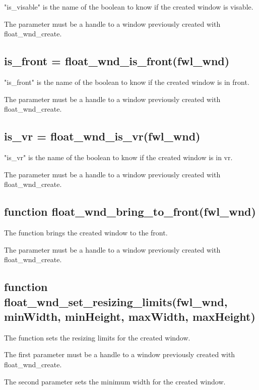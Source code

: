 \documentclass[11pt,parskip=half,a4paper]{scrartcl}
\begin{document}
"is\_visable" is the name of the boolean to know if the created window is visable.

The parameter must be a handle to a window previously created with float\_wnd\_create.

\subsection{\hspace*{1.0mm}is\_front = float\_wnd\_is\_front(fwl\_wnd)}

"is\_front" is the name of the boolean to know if the created window is in front.

The parameter must be a handle to a window previously created with float\_wnd\_create.

\subsection{\hspace*{1.0mm}is\_vr = float\_wnd\_is\_vr(fwl\_wnd)}

"is\_vr" is the name of the boolean to know if the created window is in vr.

The parameter must be a handle to a window previously created with float\_wnd\_create.

\subsection{\hspace*{1.0mm}function float\_wnd\_bring\_to\_front(fwl\_wnd)}

The function brings the created window to the front.

The parameter must be a handle to a window previously created with float\_wnd\_create.

\subsection{\hspace*{1.0mm}function float\_wnd\_set\_resizing\_limits(fwl\_wnd, minWidth, minHeight, maxWidth, maxHeight)}

The function sets the resizing limits for the created window.

The first parameter must be a handle to a window previously created with float\_wnd\_create.

The second parameter sets the  minimum width for the created window.
\end{document}
